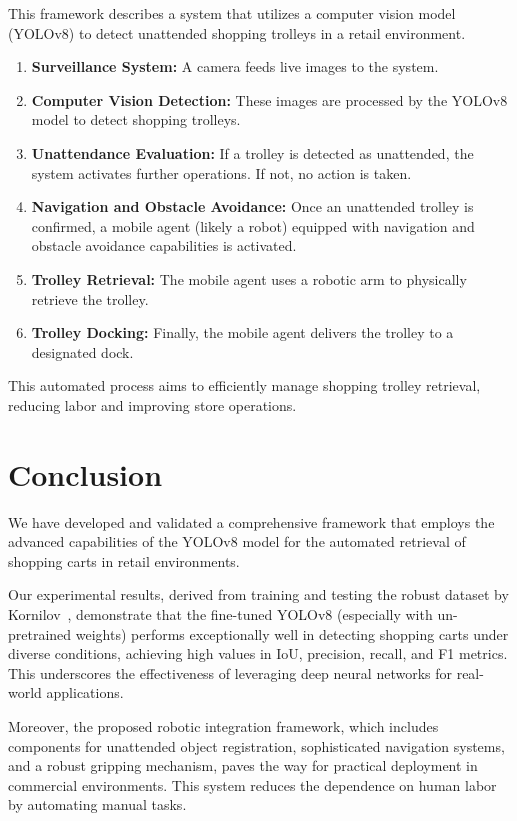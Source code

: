 \documentclass[10pt,twocolumn,letterpaper]{article}
\begin{document}
This framework describes a system that utilizes a computer vision model (YOLOv8) to detect unattended shopping trolleys in a retail environment. 
\begin{enumerate}
  \item \textbf{Surveillance System:} A camera feeds live images to the system.
  \item \textbf{Computer Vision Detection:} These images are processed by the YOLOv8 model to detect shopping trolleys.
  \item \textbf{Unattendance Evaluation:} If a trolley is detected as unattended, the system activates further operations. If not, no action is taken.
  \item \textbf{Navigation and Obstacle Avoidance:} Once an unattended trolley is confirmed, a mobile agent (likely a robot) equipped with navigation and obstacle avoidance capabilities is activated.
  \item \textbf{Trolley Retrieval:} The mobile agent uses a robotic arm to physically retrieve the trolley.
  \item \textbf{Trolley Docking:} Finally, the mobile agent delivers the trolley to a designated dock.
\end{enumerate}

This automated process aims to efficiently manage shopping trolley retrieval, reducing labor and improving store operations.

\section{Conclusion}
We have developed and validated a comprehensive framework that employs the advanced capabilities of the YOLOv8 model for the automated retrieval of shopping carts in retail environments. 

Our experimental results, derived from training and testing the robust dataset by Kornilov~\cite{kornilov-dataset}, demonstrate that the fine-tuned YOLOv8 (especially with un-pretrained weights) performs exceptionally well in detecting shopping carts under diverse conditions, achieving high values in IoU, precision, recall, and F1 metrics. This underscores the effectiveness of leveraging deep neural networks for real-world applications.

Moreover, the proposed robotic integration framework, which includes components for unattended object registration, sophisticated navigation systems, and a robust gripping mechanism, paves the way for practical deployment in commercial environments. This system reduces the dependence on human labor by automating manual tasks.
\end{document}
